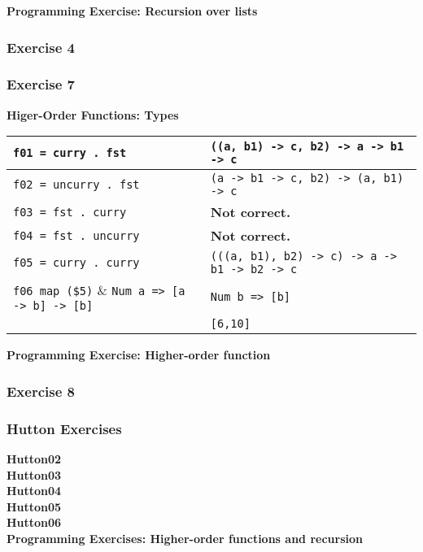 \textbf{Programming Exercise: Recursion over lists}\\

\newpage
\begin{multicols}{2}

\subsubsection{Exercise 4}


\end{multicols}
\subsubsection{Exercise 7}

\textbf{Higer-Order Functions: Types}\\
\begin{tabularx}{\linewidth}{|X|X|}
  \hline
  \lstinline|f01 = curry . fst| & \lstinline|((a, b1) -> c, b2) -> a -> b1 -> c|\\
  \hline
  \lstinline|f02 = uncurry . fst| & \lstinline|(a -> b1 -> c, b2) -> (a, b1) -> c|\\
  \hline
  \lstinline|f03 = fst . curry| & \textbf{Not correct.}\\
  \hline
  \lstinline|f04 = fst . uncurry| & \textbf{Not correct.}\\
  \hline
  \lstinline|f05 = curry . curry| & \lstinline|(((a, b1), b2) -> c) -> a -> b1 -> b2 -> c|\\
  \hline
  \lstinline|f06 map ($5)| & \lstinline|Num a => [a -> b] -> [b]|\\
  \hline
  \lstinline|v07 = map ($5) [(+1), (*2)| & \lstinline|Num b => [b]|\\
   & \lstinline|[6,10]|\\
  \hline
\end{tabularx}

\textbf{Programming Exercise: Higher-order function}\\

\newpage

\subsubsection{Exercise 8}


\subsubsection{Hutton Exercises}
\textbf{Hutton02}\\

\textbf{Hutton03}\\

\textbf{Hutton04}\\

\textbf{Hutton05}\\

\textbf{Hutton06}\\


\textbf{Programming Exercises: Higher-order functions and recursion}\\


